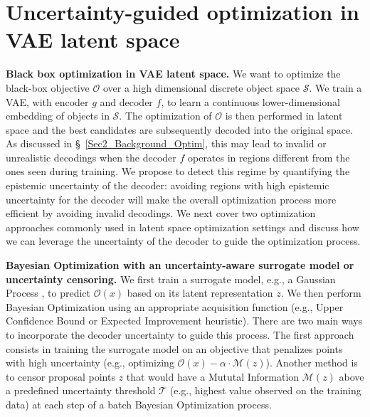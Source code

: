 \section{Uncertainty-guided optimization in VAE latent space}
\label{Sec4_Uncertainty_guided_Optimization}

\textbf{Black box optimization in VAE latent space.} We want to optimize the black-box objective $\mathcal{O}$ over a high dimensional discrete object space $\mathcal{S}$. We train a VAE, with encoder $g$ and decoder $f$, to learn a continuous lower-dimensional embedding of objects in $\mathcal{S}$. The optimization of $\mathcal{O}$ is then performed in latent space and the best candidates are subsequently decoded into the original space. As discussed in \S~\ref{Sec2_Background_Optim}, this may lead to invalid or unrealistic decodings when the decoder $f$ operates in regions different from the ones seen during training. We propose to detect this regime by quantifying the epistemic uncertainty of the decoder: avoiding regions with high epistemic uncertainty for the decoder will make the overall optimization process more efficient by avoiding invalid decodings. 
We next cover two optimization approaches commonly used in latent space optimization settings and discuss how we can leverage the uncertainty of the decoder to guide the optimization process.

\textbf{Bayesian Optimization with an uncertainty-aware surrogate model or uncertainty censoring.} We first train a surrogate model, e.g., a Gaussian Process \citep{Mchutchon2011GP}, to predict $\mathcal{O}(x)$ based on its latent representation $z$. We then perform Bayesian Optimization using an appropriate acquisition function (e.g., Upper Confidence Bound or Expected Improvement heuristic). There are two main ways to incorporate the decoder uncertainty to guide this process. The first approach consists in training the surrogate model on an objective that penalizes points with high uncertainty (e.g., optimizing $\mathcal{O}(x) - \alpha \cdot \mathcal{M}(z)$). Another method is to censor proposal points $z$ that would have a Mututal Information $\mathcal{M}(z)$ above a predefined uncertainty threshold $\mathcal{T}$ (e.g., highest value observed on the training data) at each step of a batch Bayesian Optimization process. 

